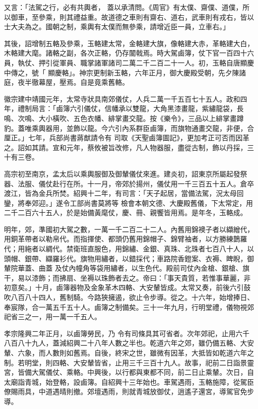 \begin{pinyinscope}
 又言：「法駕之行，必有共輿者，
 蓋以承清問。《周官》有太僕、齋僕、道僕，所以御車，至參乘，則其禮益重。故道德之車則有齋右、道右，武車則有戎右，皆以士大夫為之。國朝之制，乘輿有太僕而無參乘，請增近臣一員，立車右。」



 其後，詔增制五輅及參乘，玉輅建太常，金輅建大旗，像輅建大赤，革輅建大白，木輅建大麾。諸輅之副，各次正輅，仍存闟戟焉。時大駕鹵簿，仗下官一百四十六員，執仗、押引從軍員、職掌諸軍諸司二萬二千二百二十一人。初，玉輅自唐顯慶中傳之，號「
 顯慶輅」。神宗更制新玉輅，六年正月，御大慶殿受朝，先夕陳諸庭，夜半徹幕屋，壓焉。自是竟乘舊輅。



 徽宗建中靖國元年，太常寺狀具南郊儀仗，人兵二萬一千五百七十五人。政和四年，禮制局言：「鹵簿六引儀仗，信幡承以雙龍，大角黑漆畫龍，紫繡龍袋，長鳴、次鳴、大小橫吹、五色衣幡、緋掌畫交龍。按《樂令》，三品以上緋掌畫蹲豹。蓋唯乘輿器用，並飾以龍。今六引內系群臣鹵簿，而旗物通畫交龍，非便，合厘正。」七年，兵部尚書蔣猷請令有
 司取《天聖鹵簿圖記》，更加考正可否而因革之。詔如其請。宣和元年，蔡攸被旨改修，凡人物器服，盡從古制，飾以丹採，三十有三卷。



 高宗初至南京，孟太后以乘輿服御及御輦儀仗來進。建炎初，詔東京所屬起發祭器、法服、儀仗赴行在所。十一月，帝郊於揚州，儀仗用一千三百五十五人。倉卒渡江，皆為金兵所焚。紹興十二年，有司言：「天子起居，當備法駕，況太母回鑾，將奉郊迎。」遂令工部尚書莫將等
 檢會本朝文德、大慶殿舊儀，下太常定，用二千二百六十五人，於是始備黃麾仗，慶、冊、親饗皆用焉。是年冬，玉輅成。



 明年，郊，準國初大駕之數，一萬一千二百二十二人。內舊用錦襖子者以纈繒代，用銅革帶者以勒帛代。而指揮使、都頭仍舊用錦帽子、錦臂袖者，以方勝練鵲羅代；用絁者以綢代。禁衛班直服色，用錦繡、金銀、真珠、北珠者七百八十人，以頭帽、銀帶、纈羅衫代。旗物用繡者，以錯採代；車路院香鐙案、衣褥、睥睨，御輦院華蓋、曲蓋
 及仗內幢角等袋用繡者，以生色代。殿前司仗內金槍、銀槍、旗干，易以漆飾；而拂扇、坐褥以珠飾者去之。帝曰：「事天貴質，若惟事華麗，非初意矣。」十月，鹵簿器物及金象革木四輅、大安輦皆成。太常又奏，前後六引鼓吹八百八十四人，舊制騎。今路狹擁遏，欲止令步導。從之。十六年，始增捧日、奉宸隊，合一萬五千五十人。鹵簿之制備矣。三十一年九月，行明堂禮，儀物視郊祀省三之一，用一萬一千五人。



 孝宗隆興二年正月，以鹵簿勞民，乃
 令有司條具其可省者。次年郊祀，止用六千八百八十九人，蓋減紹興二十八年人數之半也。乾道六年之郊，雖仍備五輅、大安輦、六象，而人數則如舊焉。自後，終宋之世，雖微有因革，大抵皆如乾道六年之制。若明堂，則四輅、大安輦皆省，止用三千三百十九人。故事，祀前二日詣景靈宮，皆備大駕儀仗、乘輅。中興後，以行都與東都不同，前二日止乘輦。次日，自太廟詣青城，始登輅，設鹵簿。自紹興十三年始也。車駕遇雨，玉輅施障，從駕臣
 僚賜雨具，中道遇晴則撤。郊壇遇雨，則就青城放御仗，逍遙子還宮，導駕官免步導。




\end{pinyinscope}
